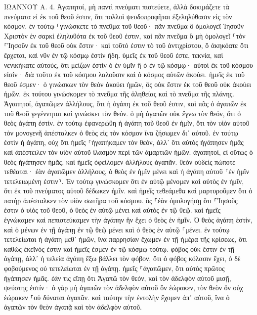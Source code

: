 \documentclass[twoside, 9pt]{extreport}
\begin{document}
ΙΩΑΝΝΟΥ Α.
4.
Ἀγαπητοί, μὴ παντὶ πνεύματι πιστεύετε, ἀλλὰ δοκιμάζετε τὰ πνεύματα εἰ ἐκ τοῦ θεοῦ ἐστιν, ὅτι πολλοὶ ψευδοπροφῆται ἐξεληλύθασιν εἰς τὸν κόσμον. 
ἐν τούτῳ ⸀γινώσκετε τὸ πνεῦμα τοῦ θεοῦ· πᾶν πνεῦμα ὃ ὁμολογεῖ Ἰησοῦν Χριστὸν ἐν σαρκὶ ἐληλυθότα ἐκ τοῦ θεοῦ ἐστιν, 
καὶ πᾶν πνεῦμα ὃ μὴ ὁμολογεῖ ⸀τὸν ⸀Ἰησοῦν ἐκ τοῦ θεοῦ οὐκ ἔστιν· καὶ τοῦτό ἐστιν τὸ τοῦ ἀντιχρίστου, ὃ ἀκηκόατε ὅτι ἔρχεται, καὶ νῦν ἐν τῷ κόσμῳ ἐστὶν ἤδη. 
ὑμεῖς ἐκ τοῦ θεοῦ ἐστε, τεκνία, καὶ νενικήκατε αὐτούς, ὅτι μείζων ἐστὶν ὁ ἐν ὑμῖν ἢ ὁ ἐν τῷ κόσμῳ· 
αὐτοὶ ἐκ τοῦ κόσμου εἰσίν· διὰ τοῦτο ἐκ τοῦ κόσμου λαλοῦσιν καὶ ὁ κόσμος αὐτῶν ἀκούει. 
ἡμεῖς ἐκ τοῦ θεοῦ ἐσμεν· ὁ γινώσκων τὸν θεὸν ἀκούει ἡμῶν, ὃς οὐκ ἔστιν ἐκ τοῦ θεοῦ οὐκ ἀκούει ἡμῶν. ἐκ τούτου γινώσκομεν τὸ πνεῦμα τῆς ἀληθείας καὶ τὸ πνεῦμα τῆς πλάνης. 
Ἀγαπητοί, ἀγαπῶμεν ἀλλήλους, ὅτι ἡ ἀγάπη ἐκ τοῦ θεοῦ ἐστιν, καὶ πᾶς ὁ ἀγαπῶν ἐκ τοῦ θεοῦ γεγέννηται καὶ γινώσκει τὸν θεόν. 
ὁ μὴ ἀγαπῶν οὐκ ἔγνω τὸν θεόν, ὅτι ὁ θεὸς ἀγάπη ἐστίν. 
ἐν τούτῳ ἐφανερώθη ἡ ἀγάπη τοῦ θεοῦ ἐν ἡμῖν, ὅτι τὸν υἱὸν αὐτοῦ τὸν μονογενῆ ἀπέσταλκεν ὁ θεὸς εἰς τὸν κόσμον ἵνα ζήσωμεν δι᾽ αὐτοῦ. 
ἐν τούτῳ ἐστὶν ἡ ἀγάπη, οὐχ ὅτι ἡμεῖς ⸀ἠγαπήκαμεν τὸν θεόν, ἀλλ᾽ ὅτι αὐτὸς ἠγάπησεν ἡμᾶς καὶ ἀπέστειλεν τὸν υἱὸν αὐτοῦ ἱλασμὸν περὶ τῶν ἁμαρτιῶν ἡμῶν. 
ἀγαπητοί, εἰ οὕτως ὁ θεὸς ἠγάπησεν ἡμᾶς, καὶ ἡμεῖς ὀφείλομεν ἀλλήλους ἀγαπᾶν. 
θεὸν οὐδεὶς πώποτε τεθέαται· ἐὰν ἀγαπῶμεν ἀλλήλους, ὁ θεὸς ἐν ἡμῖν μένει καὶ ἡ ἀγάπη αὐτοῦ ⸂ἐν ἡμῖν τετελειωμένη ἐστιν⸃. 
Ἐν τούτῳ γινώσκομεν ὅτι ἐν αὐτῷ μένομεν καὶ αὐτὸς ἐν ἡμῖν, ὅτι ἐκ τοῦ πνεύματος αὐτοῦ δέδωκεν ἡμῖν. 
καὶ ἡμεῖς τεθεάμεθα καὶ μαρτυροῦμεν ὅτι ὁ πατὴρ ἀπέσταλκεν τὸν υἱὸν σωτῆρα τοῦ κόσμου. 
ὃς ⸀ἐὰν ὁμολογήσῃ ὅτι ⸀Ἰησοῦς ἐστιν ὁ υἱὸς τοῦ θεοῦ, ὁ θεὸς ἐν αὐτῷ μένει καὶ αὐτὸς ἐν τῷ θεῷ. 
καὶ ἡμεῖς ἐγνώκαμεν καὶ πεπιστεύκαμεν τὴν ἀγάπην ἣν ἔχει ὁ θεὸς ἐν ἡμῖν. Ὁ θεὸς ἀγάπη ἐστίν, καὶ ὁ μένων ἐν τῇ ἀγάπῃ ἐν τῷ θεῷ μένει καὶ ὁ θεὸς ἐν αὐτῷ ⸀μένει. 
ἐν τούτῳ τετελείωται ἡ ἀγάπη μεθ᾽ ἡμῶν, ἵνα παρρησίαν ἔχωμεν ἐν τῇ ἡμέρᾳ τῆς κρίσεως, ὅτι καθὼς ἐκεῖνός ἐστιν καὶ ἡμεῖς ἐσμεν ἐν τῷ κόσμῳ τούτῳ. 
φόβος οὐκ ἔστιν ἐν τῇ ἀγάπῃ, ἀλλ᾽ ἡ τελεία ἀγάπη ἔξω βάλλει τὸν φόβον, ὅτι ὁ φόβος κόλασιν ἔχει, ὁ δὲ φοβούμενος οὐ τετελείωται ἐν τῇ ἀγάπῃ. 
ἡμεῖς ⸀ἀγαπῶμεν, ὅτι αὐτὸς πρῶτος ἠγάπησεν ἡμᾶς. 
ἐάν τις εἴπῃ ὅτι Ἀγαπῶ τὸν θεόν, καὶ τὸν ἀδελφὸν αὐτοῦ μισῇ, ψεύστης ἐστίν· ὁ γὰρ μὴ ἀγαπῶν τὸν ἀδελφὸν αὐτοῦ ὃν ἑώρακεν, τὸν θεὸν ὃν οὐχ ἑώρακεν ⸀οὐ δύναται ἀγαπᾶν. 
καὶ ταύτην τὴν ἐντολὴν ἔχομεν ἀπ᾽ αὐτοῦ, ἵνα ὁ ἀγαπῶν τὸν θεὸν ἀγαπᾷ καὶ τὸν ἀδελφὸν αὐτοῦ. 
\end{document}
